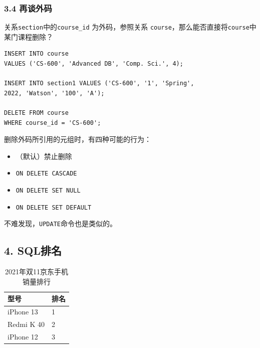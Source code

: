 \documentclass[aspectratio=169, 14pt]{beamer}
\begin{document}
\begin{frame}[fragile]
    \frametitle{3.4 再谈外码}
关系\texttt{section}中的\texttt{course\_id} 为外码，参照关系 \texttt{course}，那么能否直接将\texttt{course}中某门课程删除？

\begin{verbatim}
INSERT INTO course
VALUES ('CS-600', 'Advanced DB', 'Comp. Sci.', 4);

INSERT INTO section1 VALUES ('CS-600', '1', 'Spring', 
2022, 'Watson', '100', 'A');

DELETE FROM course
WHERE course_id = 'CS-600';
\end{verbatim}  

\end{frame}

\begin{frame}
删除外码所引用的元组时，有四种可能的行为：
    \begin{itemize}
        \item（默认）禁止删除
        \item \texttt{ON DELETE CASCADE}
        \item \texttt{ON DELETE SET NULL}
        \item \texttt{ON DELETE SET DEFAULT}
    \end{itemize}

不难发现，\texttt{UPDATE}命令也是类似的。

\end{frame}

\begin{frame}
    \section{\textcolor{darkmidnightblue}{4. SQL排名}} 

    \begin{table}
        \caption*{2021年双11京东手机销量排行}
        \begin{tabular}{ll}
          \toprule
          型号 & 排名 \\
          \midrule
          iPhone 13 & 1 \\
          Redmi K 40 & 2 \\
          iPhone 12 & 3 \\
          \bottomrule
        \end{tabular}
    \end{table}
\end{frame}
\end{document}
